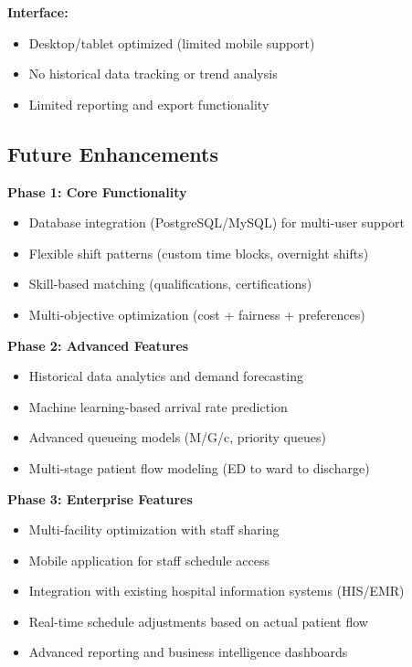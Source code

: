\documentclass[12pt,a4paper]{article}
\begin{document}
\textbf{Interface:}
\begin{itemize}
    \item Desktop/tablet optimized (limited mobile support)
    \item No historical data tracking or trend analysis
    \item Limited reporting and export functionality
\end{itemize}

\subsection{Future Enhancements}

\textbf{Phase 1: Core Functionality}
\begin{itemize}
    \item Database integration (PostgreSQL/MySQL) for multi-user support
    \item Flexible shift patterns (custom time blocks, overnight shifts)
    \item Skill-based matching (qualifications, certifications)
    \item Multi-objective optimization (cost + fairness + preferences)
\end{itemize}

\textbf{Phase 2: Advanced Features}
\begin{itemize}
    \item Historical data analytics and demand forecasting
    \item Machine learning-based arrival rate prediction
    \item Advanced queueing models (M/G/c, priority queues)
    \item Multi-stage patient flow modeling (ED to ward to discharge)
\end{itemize}

\textbf{Phase 3: Enterprise Features}
\begin{itemize}
    \item Multi-facility optimization with staff sharing
    \item Mobile application for staff schedule access
    \item Integration with existing hospital information systems (HIS/EMR)
    \item Real-time schedule adjustments based on actual patient flow
    \item Advanced reporting and business intelligence dashboards
\end{itemize}
\end{document}
